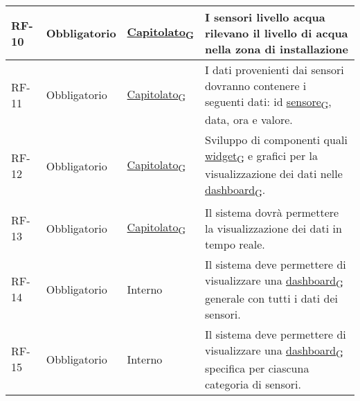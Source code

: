 \begin{longtable}{|>{\centering\arraybackslash}m{}|>{\centering\arraybackslash}m{}|>{\centering\arraybackslash}m{}|>{\centering\arraybackslash}m{}|}
	RF-10           & Obbligatorio        & \href{https://7last.github.io/docs/rtb/documentazione-interna/glossario\#capitolato}{Capitolato\textsubscript{G}}     & I sensori livello acqua rilevano il livello di acqua nella zona di installazione                                                                                                                                                                                                                        \\\hline
	RF-11           & Obbligatorio        & \href{https://7last.github.io/docs/rtb/documentazione-interna/glossario\#capitolato}{Capitolato\textsubscript{G}}     & I dati provenienti dai sensori dovranno contenere i seguenti dati: id \href{https://7last.github.io/docs/rtb/documentazione-interna/glossario\#sensore}{sensore\textsubscript{G}}, data, ora e valore.                                                                                                  \\\hline
	RF-12           & Obbligatorio        & \href{https://7last.github.io/docs/rtb/documentazione-interna/glossario\#capitolato}{Capitolato\textsubscript{G}}     & Sviluppo di componenti quali \href{https://7last.github.io/docs/rtb/documentazione-interna/glossario\#widget}{widget\textsubscript{G}} e grafici per la visualizzazione dei dati nelle \href{https://7last.github.io/docs/rtb/documentazione-interna/glossario\#dashboard}{dashboard\textsubscript{G}}. \\\hline
	RF-13           & Obbligatorio        & \href{https://7last.github.io/docs/rtb/documentazione-interna/glossario\#capitolato}{Capitolato\textsubscript{G}}     & Il sistema dovrà permettere la visualizzazione dei dati in tempo reale.                                                                                                                                                                                                                                 \\\hline
	RF-14           & Obbligatorio        & Interno        & Il sistema deve permettere di visualizzare una \href{https://7last.github.io/docs/rtb/documentazione-interna/glossario\#dashboard}{dashboard\textsubscript{G}} generale con tutti i dati dei sensori.                                                                                                                                                                                                         \\\hline
	RF-15           & Obbligatorio        & Interno        & Il sistema deve permettere di visualizzare una \href{https://7last.github.io/docs/rtb/documentazione-interna/glossario\#dashboard}{dashboard\textsubscript{G}} specifica per ciascuna categoria di sensori.                                                                                                                                                                                                   \\\hline

\end{longtable}
